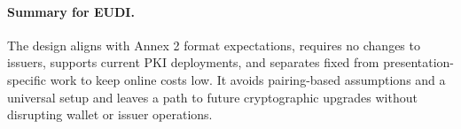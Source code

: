 \paragraph{Summary for EUDI.}
The design aligns with Annex 2 format expectations, requires no changes to issuers, supports current PKI deployments, and separates fixed from presentation-specific work to keep online costs low. It avoids pairing-based assumptions and a universal setup and leaves a path to future cryptographic upgrades without disrupting wallet or issuer operations.

